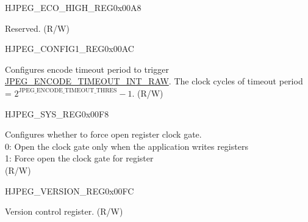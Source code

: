 \begin{register}{H}{JPEG\_ECO\_HIGH\_REG}{0x00A8}\label{regdesc:JPEGECOHIGHREG}
%
\regnewline%
\begin{regdesc}\begin{reglist}
\label{fielddesc:JPEGRDNECOHIGH}\item [JPEG\_RDN\_ECO\_HIGH] Reserved. (R/W)
\end{reglist}\end{regdesc}
\end{register}


\begin{register}{H}{JPEG\_CONFIG1\_REG}{0x00AC}\label{regdesc:JPEGCONFIG1REG}
%
%
\regnewline%
\begin{regdesc}\begin{reglist}
\label{fielddesc:JPEGENCODETIMEOUTTHRES}\item [JPEG\_ENCODE\_TIMEOUT\_THRES] Configures encode timeout period to trigger \hyperref[fielddesc:JPEGENCODETIMEOUTINTRAW]{JPEG\_ENCODE\_TIMEOUT\_INT\_RAW}. The clock cycles of timeout period = $2^{\mathrm{JPEG\_ENCODE\_TIMEOUT\_THRES}} - 1$. (R/W)
\end{reglist}\end{regdesc}
\end{register}


\begin{register}{H}{JPEG\_SYS\_REG}{0x00F8}\label{regdesc:JPEGSYSREG}
%
%
\regnewline%
\begin{regdesc}\begin{reglist}
\label{fielddesc:JPEGCLKEN}\item [JPEG\_CLK\_EN] Configures whether to force open register clock gate.\\
0: Open the clock gate only when the application writes registers\\
1: Force open the clock gate for register\\
(R/W)
\end{reglist}\end{regdesc}
\end{register}


\begin{register}{H}{JPEG\_VERSION\_REG}{0x00FC}\label{regdesc:JPEGVERSIONREG}
%
%
\regnewline%
\begin{regdesc}\begin{reglist}
\label{fielddesc:JPEGJPEGVER}\item [JPEG\_JPEG\_VER] Version control register. (R/W)
\end{reglist}\end{regdesc}
\end{register}


